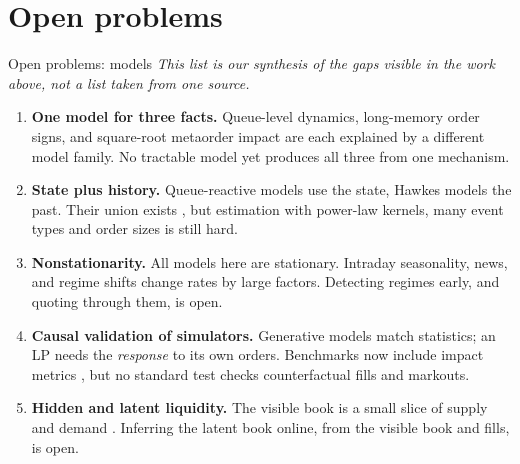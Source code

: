 \section{Open problems}

\begin{frame}{Open problems: models}
  \small
  \textit{This list is our synthesis of the gaps visible in the work above, not a list taken from one source.}
  \begin{enumerate}
    \item \textbf{One model for three facts.} Queue-level dynamics, long-memory order signs, and square-root metaorder impact are each explained by a different model family. No tractable model yet produces all three from one mechanism.
    \item \textbf{State plus history.} Queue-reactive models use the state, Hawkes models the past. Their union exists \citep{wu2019queue}, but estimation with power-law kernels, many event types and order sizes is still hard.
    \item \textbf{Nonstationarity.} All models here are stationary. Intraday seasonality, news, and regime shifts change rates by large factors. Detecting regimes early, and quoting through them, is open.
    \item \textbf{Causal validation of simulators.} Generative models match statistics; an LP needs the \emph{response} to its own orders. Benchmarks now include impact metrics \citep{nagy2025lobbench}, but no standard test checks counterfactual fills and markouts.
    \item \textbf{Hidden and latent liquidity.} The visible book is a small slice of supply and demand \citep{donier2015fully}. Inferring the latent book online, from the visible book and fills, is open.
  \end{enumerate}
\end{frame}

